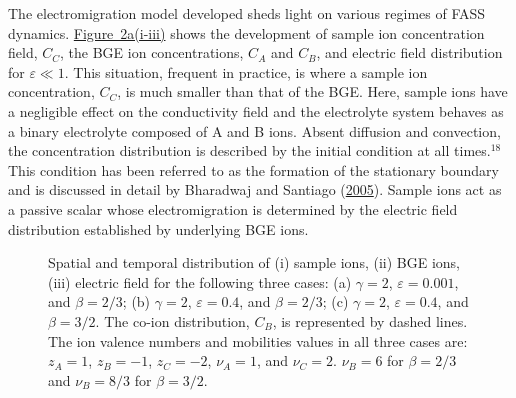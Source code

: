 \documentclass[lineno,authoryear]{FLO_v1}%
\theoremstyle{definition}
\begin{document}
The electromigration model developed sheds light on various
regimes of FASS dynamics. \hyperref[fig2]{Figure~2a(i-iii)}
shows the development of sample ion concentration field,
$C_{C}$, the BGE ion concentrations, $C_{A}$ and $C_{B}$,
and electric field distribution for $\varepsilon \ll1$.
This situation, frequent in practice, is where a sample ion
concentration, $C_{C}$, is much smaller than that of the
BGE. Here, sample ions have a negligible effect on the
conductivity field and the electrolyte system behaves as a
binary electrolyte composed of A and B ions. Absent
diffusion and convection, the concentration distribution is
described by the initial condition at all times.$^{18}$
This condition has been referred to as the formation of the
stationary boundary and is discussed in detail by Bharadwaj
and Santiago (\hyperlink{bib1}{2005}). Sample ions act as a
passive scalar whose electromigration is determined by the
electric field distribution established by underlying BGE
ions.

\begin{figure}[]
\caption{Spatial and temporal distribution of (i) sample ions,
(ii) BGE ions, (iii) electric field for the following
three cases: (a) $\gamma =2$, $\varepsilon
=0.001$, and $\beta=2/3$; (b) $\gamma =2$,
$\varepsilon =0.4$, and $\beta =2/3$; (c) $\gamma=2$,
$\varepsilon =0.4$, and $\beta =3/2$. The
co-ion distribution, $C_{B}$, is represented by dashed
lines. The ion valence numbers and mobilities values in
all three cases are: $z_{A}=1$, $z_{B}=-1$,
$z_{C}=-2$, $\nu_{A}=1$, and $\nu_{C}=2$. $\nu_{B}=6$ for $\beta=2/3$
and $\nu_{B}=8/3$ for $\beta=3/2$.\label{fig2}}
\end{figure}
\end{document}
